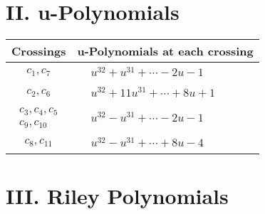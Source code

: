 \documentclass[1p]{elsarticle_modified}
\theoremstyle{definition}
\begin{document}
\newpage\renewcommand{\arraystretch}{1}
\centering \section*{ II. u-Polynomials}
\begin{tabular}{m{50pt}|m{274pt}}
Crossings & \hspace{64pt}u-Polynomials at each crossing \\
\hline $$\begin{aligned}c_{1},c_{7}\end{aligned}$$&$\begin{aligned}
&u^{32}+u^{31}+\cdots-2 u-1
\end{aligned}$\\
\hline $$\begin{aligned}c_{2},c_{6}\end{aligned}$$&$\begin{aligned}
&u^{32}+11 u^{31}+\cdots+8 u+1
\end{aligned}$\\
\hline $$\begin{aligned}c_{3},c_{4},c_{5}\\c_{9},c_{10}\end{aligned}$$&$\begin{aligned}
&u^{32}- u^{31}+\cdots-2 u-1
\end{aligned}$\\
\hline $$\begin{aligned}c_{8},c_{11}\end{aligned}$$&$\begin{aligned}
&u^{32}- u^{31}+\cdots+8 u-4
\end{aligned}$\\
\hline
\end{tabular}\newpage\renewcommand{\arraystretch}{1}
\centering \section*{ III. Riley Polynomials}
\end{document}
